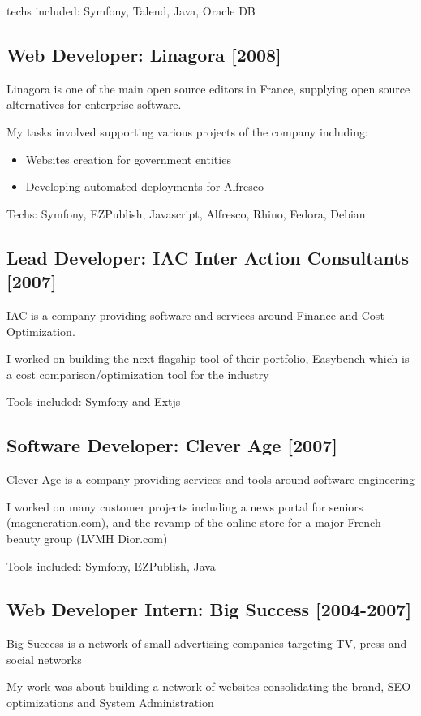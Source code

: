 \documentclass{article}
\begin{document}
techs included: Symfony, Talend, Java, Oracle DB

\subsection*{Web Developer: Linagora [2008]}
Linagora is one of the main open source editors in France, supplying
open source alternatives for enterprise software.

My tasks involved supporting various projects of the company including:

\begin{itemize}
\item Websites creation for government entities
\item Developing automated deployments for Alfresco
\end{itemize}
Techs: Symfony, EZPublish, Javascript, Alfresco, Rhino, Fedora, Debian

\subsection*{Lead Developer: IAC Inter Action Consultants [2007]}
IAC is a company providing software and services around Finance and Cost Optimization.

I worked on building the next flagship tool of their portfolio, Easybench which is a cost comparison/optimization
tool for the industry

Tools included: Symfony and Extjs

\subsection*{Software Developer: Clever Age [2007]}
Clever Age is a company providing services and tools around software engineering

I worked on many customer projects including a news portal for seniors (mageneration.com),
and the revamp of the online store for a major French beauty group (LVMH Dior.com)

Tools included: Symfony, EZPublish, Java

\subsection*{Web Developer Intern: Big Success [2004-2007]}
Big Success is a network of small advertising companies targeting TV, press and social networks

My work was about building a network of websites consolidating the brand, SEO optimizations and System Administration
\end{document}
